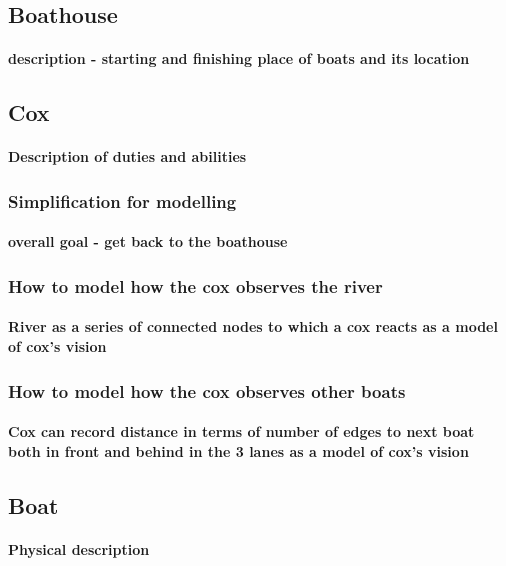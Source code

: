     \subsection{Boathouse}
      \paragraph{description - starting and finishing place of boats and its location}
    
    \subsection{Cox}
      \paragraph{Description of duties and abilities}
      \subsubsection{Simplification for modelling}
        \paragraph{overall goal - get back to the boathouse}
      \subsubsection{How to model how the cox observes the river}
        \paragraph{River as a series of connected nodes to which a cox reacts as a model of cox's vision}
      \subsubsection{How to model how the cox observes other boats}
        \paragraph{Cox can record distance in terms of number of edges to next boat both in front and behind in the 3 lanes as a model of cox's vision}
        
    \subsection{Boat}
      \paragraph{Physical description}

